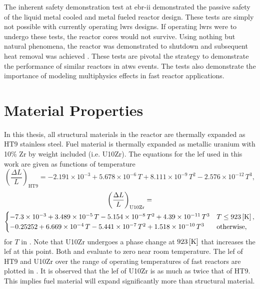   The inherent safety demonstration test at \gls{ebr-ii} demonstrated the
  passive safety of the liquid metal cooled and metal fueled reactor design.
  These tests are simply not possible with currently operating \glspl{lwr}
  designs. If operating \glspl{lwr} were to undergo these tests, the reactor
  cores would not survive. Using nothing but natural phenomena, the reactor was
  demonstrated to shutdown and subsequent heat removal was achieved
  \cite{ebriitests}. These tests are pivotal the strategy to demonstrate the
  performance of similar reactors in \gls{atws} events. The tests also
  demonstrate the importance of modeling multiphysics effects in fast reactor
  applications.

\section{Material Properties}
  \label{sec:model_details__material_properties}
  In this thesis, all structural materials in the reactor are thermally expanded
  as HT9 stainless steel. Fuel material is thermally expanded as metallic
  uranium with 10\% Zr by weight included (i.e. U10Zr). The equations for the
  \gls{lef} used in this work are given as functions of temperature
  \begin{equation}
    \label{eq:lef_ht9}
    \left( \frac{\Delta L}{L} \right)_{\text{HT9}} = 
      -2.191 \times 10^{-3} + 5.678 \times 10^{-6} \, T + 
      8.111 \times 10^{-9} \, T^2 - 2.576 \times 10^{-12} \, T^3 ,
  \end{equation}
  \begin{multline}
    \label{eq:lef_u10zr}
    \left( \frac{\Delta L}{L} \right)_{\text{U10Zr}} = \\
      \begin{cases}
        -7.3 \times 10^{-3} + 3.489 \times 10^{-5} \, T 
          - 5.154 \times 10^{-8} \, T^2 + 4.39 \times 10^{-11} \, T^3 & 
          T \le 923 \left[\text{{K}}\right], \\
        -0.25252 + 6.669 \times 10^{-4} \, T - 5.441 \times 10^{-7} \, T^2 
          + 1.518 \times 10^{-10} \, T^3 & \text{otherwise},
      \end{cases}
  \end{multline}
  for $T$ in  \cite{ht9Prop,thexpU10Zr}. Note that U10Zr undergoes a
  phase change at $923 \left[\text{{K}}\right]$ that increases the \gls{lef} at this point.
  Both  and  evaluate to zero near room
  temperature. The \gls{lef} of HT9 and U10Zr over the range of operating
  temperatures of fast reactors are plotted in . It is
  observed that the \gls{lef} of U10Zr is as much as twice that of HT9. This
  implies fuel material will expand significantly more than structural
  material.

